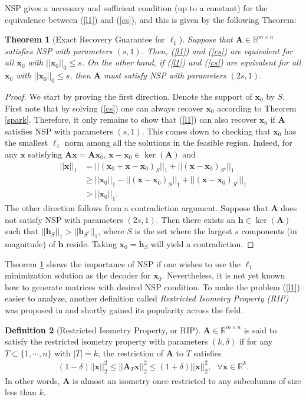 \documentclass[11pt]{article}
\numberwithin{equation}{section}
\theoremstyle{plain}
\newtheorem{Th}{Theorem}[section]
\theoremstyle{definition}
\newtheorem{Def}[Th]{Definition}
\def\R{{\mathbb R}}
\def\R{{\mathbb R}}
\def\A{{\mathbf A}}
\def\x{{\mathbf x}}
\def\h{{\mathbf{h}}}
\begin{document}
NSP gives a necessary and sufficient condition (up to a constant) for the equivalence between (\ref{l1}) and (\ref{cs}), and this is given by the following Theorem:

\begin{Th}[Exact Recovery Guarantee for $\ell_1$]\label{NSP-Th}
Suppose that $\A\in\R^{m\times n}$ satisfies NSP with parameters $(s, 1)$. Then, (\ref{l1}) and (\ref{cs}) are equivalent for all $\x_0$ with $||\x_0||_0\leq s$. On the other hand, if (\ref{l1}) and (\ref{cs}) are equivalent for all $\x_0$ with $||\x_0||_0\leq s$, then $\A$ must satisfy NSP with parameters $(2s,1)$.  
\end{Th} 
\begin{proof}
We start by proving the first direction. Denote the support of $\x_0$ by $S$. First note that by solving (\ref{cs}) one can always recover $\x_0$ according to Theorem \ref{spark}. Therefore, it only remains to show that (\ref{l1}) can also recover $\x_0$ if $\A$ satisfies NSP with parameters $(s,1)$. This comes down to checking that $\x_0$ has the smallest $\ell_1$ norm among all the solutions in the feasible region. Indeed, for any $\x$ satisfying $\A\x=\A\x_0$, $\x-\x_0\in\ker(\A)$ and 
\begin{align*}
||\x||_1&=||(\x_0+\x-\x_0)_S||_1+||(\x-\x_0)_{S^c}||_1\\
&\geq ||\x_0||_1-||(\x-\x_0)_S||_1+||(\x-\x_0)_{S^c}||_1\\
&>||\x_0||_1. 
\end{align*} 
The other direction follows from a contradiction argument. Suppose that $\A$ does not satisfy NSP with parameters $(2s,1)$. Then there exists an $\h\in\ker(\A)$ such that $||\h_S||_1>||\h_{S^c}||_1$, where $S$ is the set where the largest $s$ components (in magnitude) of $\h$ reside. Taking $\x_0=\h_S$ will yield a contradiction.   
\end{proof}

Theorem \ref{NSP-Th} shows the importance of NSP if one wishes to use the $\ell_1$ minimization solution as the decoder for $\x_0$. Nevertheless, it is not yet known how to generate matrices with desired NSP condition. To make the problem (\ref{l1}) easier to analyze, another definition called \emph{Restricted Isometry Property (RIP)} was proposed in \cite{candes2004near} and shortly gained its popularity across the field.  

\begin{Def}[Restricted Isometry Property, or RIP]
$\A\in\R^{m\times n}$ is said to satisfy the restricted isometry property with parameters $(k, \delta)$ if for any $T\subset\{1, \cdots, n\}$ with $|T|= k$, the restriction of $\A$ to $T$ satisfies
\begin{align}
(1-\delta)||\x||^2_2\leq ||\A_T\x||^2_2\leq (1+\delta)||\x||^2_2, \ \ \ \forall\x\in\R^k. 
\end{align}
In other words, $\A$ is almost an isometry once restricted to any subcolumns of size less than $k$.  
\end{Def}
\end{document}

